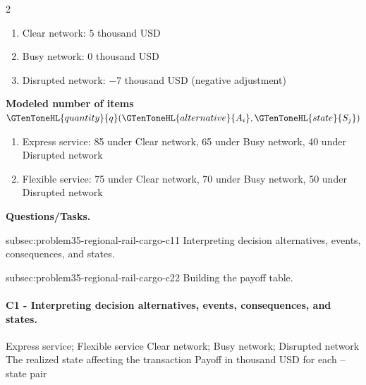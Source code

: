 \begin{multicols}{2}
\begin{enumerate}[label=\arabic*.]
\item Clear network: $5$ thousand USD
\item Busy network: $0$ thousand USD
\item Disrupted network: $-7$ thousand USD (negative adjustment)\end{enumerate}
\textbf{Modeled number of items $\GTenToneHL{quantity}{q}(\GTenToneHL{alternative}{A_i},\GTenToneHL{state}{S_j})$}
\begin{enumerate}[label=\arabic*.]
\item Express service: 85 under Clear network, 65 under Busy network, 40 under Disrupted network
\item Flexible service: 75 under Clear network, 70 under Busy network, 50 under Disrupted network
\end{enumerate}
	\end{multicols}

	\textbf{Questions/Tasks.}
	\begin{enumerate}
	\CriterionTask
	{subsec:problem35-regional-rail-cargo-c1}{1}
	{Interpreting decision alternatives, events, consequences, and states.}

	\CriterionTask
	{subsec:problem35-regional-rail-cargo-c2}{2}
	{Building the payoff table.}
	\end{enumerate}

	\paragraph*{C1 - Interpreting decision alternatives, events, consequences, and states.}
	\label{subsec:problem35-regional-rail-cargo-c1}
	\DecisionElementsTable
	{Express service; Flexible service}
	{Clear network; Busy network; Disrupted network}
	{The realized state affecting the transaction}
	{Payoff in thousand USD for each --state pair}

